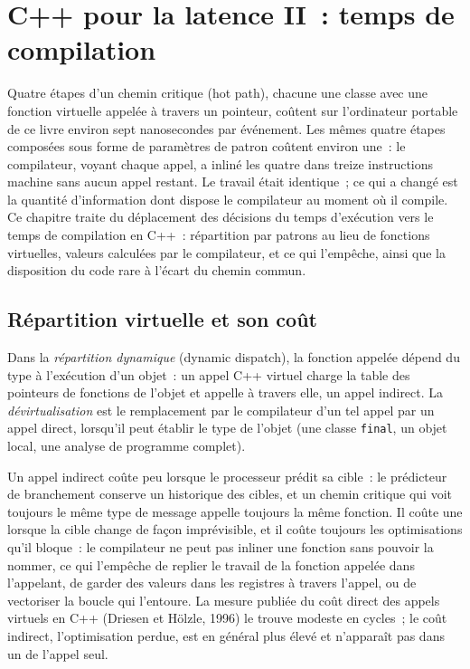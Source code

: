 \chapter{C++ pour la latence II~: temps de compilation}\label{ch:ll:cpp-for-latency-ii-compile-time}

Quatre étapes d'un chemin critique (hot path), chacune une classe avec une fonction virtuelle appelée à travers un pointeur, coûtent sur l'ordinateur portable de ce livre environ
sept nanosecondes par événement. Les mêmes quatre étapes composées sous forme de paramètres de patron coûtent environ une~: le compilateur, voyant
chaque appel, a inliné les quatre dans treize instructions machine sans aucun appel restant. Le travail était identique~; ce qui
a changé est la quantité d'information dont dispose le compilateur au moment où il compile. Ce chapitre traite du déplacement des décisions du temps d'exécution vers le temps
de compilation en C++~: répartition par patrons au lieu de fonctions virtuelles, valeurs calculées par le compilateur,  et ce qui l'empêche,
ainsi que la disposition du code rare à l'écart du chemin commun.

\section{Répartition virtuelle et son coût}

\begin{definition}\label{def:ll:cpp-for-latency-ii-compile-time:dyn}
Dans la \emph{répartition dynamique} (dynamic dispatch), la fonction appelée dépend du type à l'exécution d'un objet~: un appel C++
virtuel charge la table des pointeurs de fonctions de l'objet et appelle à travers elle, un appel indirect. La \emph{dévirtualisation}
est le remplacement par le compilateur d'un tel appel par un appel direct, lorsqu'il peut établir le type de l'objet (une classe \texttt{final},
un objet local, une analyse de programme complet).
\end{definition}

Un appel indirect coûte peu lorsque le processeur prédit sa cible~: le prédicteur de branchement conserve un historique des cibles,
et un chemin critique qui voit toujours le même type de message appelle toujours la même fonction. Il coûte une  lorsque la
cible change de façon imprévisible, et il coûte toujours les optimisations qu'il bloque~: le compilateur ne peut pas inliner une fonction sans pouvoir la nommer,
ce qui l'empêche de replier le travail de la fonction appelée dans l'appelant, de garder des valeurs dans les registres à travers l'appel, ou de vectoriser
la boucle qui l'entoure. La mesure publiée du coût direct des appels virtuels en C++ (Driesen et Hölzle, 1996) le trouve
modeste en cycles~; le coût indirect, l'optimisation perdue, est en général plus élevé et n'apparaît pas dans un  de
l'appel seul.

